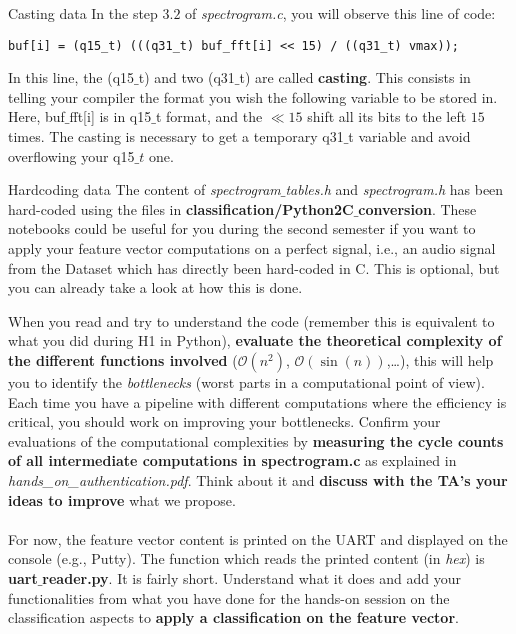 \begin{bclogo}[couleur = gray!20, arrondi = 0.2, logo=\bcinfo]{Casting data}
%
In the step $3.2$ of \emph{spectrogram.c}, you will observe this line of code:
%
\begin{lstlisting}
buf[i] = (q15_t) (((q31_t) buf_fft[i] << 15) / ((q31_t) vmax));
\end{lstlisting}
%
In this line, the (q15$\_$t) and two (q31$\_$t) are called \textbf{casting}. This consists in telling your compiler the format you wish the following variable to be stored in. Here, buf$\_$fft[i] is in q15$\_$t format, and the $\ll 15$ shift all its bits to the left $15$ times. The casting is necessary to get a temporary q31$\_$t variable and avoid overflowing your q15$\_t$ one.
%
\end{bclogo}
%
\begin{bclogo}[couleur = gray!20, arrondi = 0.2, logo=\bcinfo]{Hardcoding data}
The content of \emph{spectrogram$\_$tables.h} and \emph{spectrogram.h} has been hard-coded using the files in \textbf{classification/Python2C$\_$conversion}. These notebooks could be useful for you during the second semester if you want to apply your feature vector computations on a perfect signal, i.e., an audio signal from the Dataset which has directly been hard-coded in C. This is optional, but you can already take a look at how this is done.
\end{bclogo}
%
When you read and try to understand the code (remember this is equivalent to what you did during H1 in Python), \textbf{evaluate the theoretical complexity of the different functions involved} ($\mathcal O(n^2)$, $\mathcal O(\sin (n))$,\ldots), this will help you to identify the \emph{bottlenecks} (worst parts in a computational point of view). Each time you have a pipeline with different computations where the efficiency is critical, you should work on improving your bottlenecks. Confirm your evaluations of the computational complexities by \textbf{measuring the cycle counts of all intermediate computations in spectrogram.c} as explained in \emph{hands\_on\_authentication.pdf}.
Think about it and \textbf{discuss with the TA's your ideas to improve} what we propose. \\
\\
For now, the feature vector content is printed on the UART and displayed on the console (e.g., Putty). The function which reads the printed content (in \emph{hex}) is \textbf{uart$\_$reader.py}. It is fairly short. Understand what it does and add your functionalities from what you have done for the hands-on session on the classification aspects to \textbf{apply a classification on the feature vector}. \\
